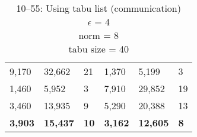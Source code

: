 \begin{table}
\begin{tabular}{R{1.5cm}|R{1.8cm}|R{1cm}||R{1.5cm}|R{1.8cm}|R{1cm}}
9,170 & 32,662 & 21 & 1,370 & 5,199 & 3 \\   
1,460 & 5,952 & 3 & 7,910 & 29,852 & 19 \\   
3,460 & 13,935 & 9 & 5,290 & 20,388 & 13 \\ 
\hline  
\textbf{3,903} & \textbf{15,437} & \textbf{10} & \textbf{3,162} & \textbf{12,605} & \textbf{8}\\
\hline
\end{tabular}
\caption{\gr{} 10--55: Using tabu list (communication)\\ $\epsilon$ = 4\\norm = 8\\tabu size = 40}\label{subtab:gr10_tabu_comm}
\end{table}



